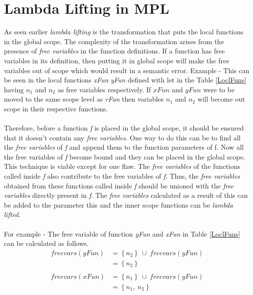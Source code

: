\documentclass[11pt]{article}
\begin{document}
\section {Lambda Lifting in MPL}
As seen earlier {\em lambda lifting} is the transformation that puts the local functions in the global scope. The complexity of the transformation arises from the presence of {\em free variables} in the function definitions. If a function has free variables in its definition, then putting it in global scope will make the free variables out of scope which would result in a semantic error. Example - This can be seen in the local functions {\em xFun} {\em yFun} defined with {\sf let} in the Table \ref{LoclFuns} having $n_1$ and $n_2$ as free variables respectively. If $xFun$ and $yFun$ were to be moved to the same scope level as {\em rFun} then variables $n_1$ and $n_2$ will become out scope in their respective functions.
~~\\~~\\ 
Therefore, before a function {\em f} is placed in the global scope, it should be ensured that it doesn't contain any {\em free variables}. One way to do this can be to find all the {\em free variables} of {\em f} and append them to the function parameters of f. Now all the free variables of {\em f} become bound and they can be placed in the global scope. This technique is viable except for one flaw. The {\em free variables} of the functions called inside {\em f} also contribute to the free variables of {\em f}. Thus, the {\em free variables} obtained from these functions called inside {\em f} should be unioned with the {\em free variables} directly present in {\em f}. The {\em free variables} calculated as a result of this can be added to the parameter this and the inner scope functions can be {\em lambda lifted}.
~~\\~~\\
For example - The free variable of function {\em yFun} and {\em xFun} in Table \ref {LoclFuns} can be calculated as follows.
\begin{align*}
free vars (yFun) &= \left\{n_2\right\}~\cup ~free vars (yFun) \\ 
                 &= \left\{n_2\right\} \\~~\\ 
free vars (xFun) &= \left\{n_1\right\}~\cup ~free vars (yFun) \\ 
                 &= \left\{n_1,~n_2\right\} \\ 
\end{align*}
\end{document}
